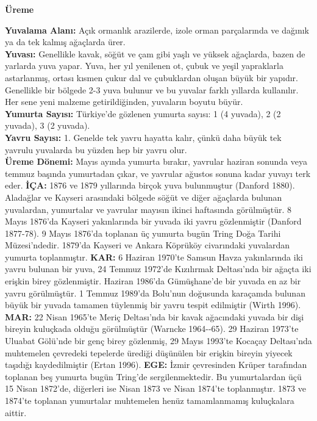 \documentclass[
  letterpaper,
  DIV=11,
  numbers=noendperiod]{scrreprt}
\begin{document}
\textbf{Üreme}

\textbf{Yuvalama Alanı:} Açık ormanlık arazilerde, izole orman
parçalarında ve dağınık ya da tek kalmış ağaçlarda ürer.\\
\textbf{Yuvası:} Genellikle kavak, söğüt ve çam gibi yaşlı ve yüksek
ağaçlarda, bazen de yarlarda yuva yapar. Yuva, her yıl yenilenen ot,
çubuk ve yeşil yapraklarla astarlanmış, ortası kısmen çukur dal ve
çubuklardan oluşan büyük bir yapıdır. Genellikle bir bölgede 2-3 yuva
bulunur ve bu yuvalar farklı yıllarda kullanılır. Her sene yeni malzeme
getirildiğinden, yuvaların boyutu büyür.\\
\textbf{Yumurta Sayısı:} Türkiye'de gözlenen yumurta sayısı: 1 (4
yuvada), 2 (2 yuvada), 3 (2 yuvada).\\
\textbf{Yavru Sayısı:} 1. Genelde tek yavru hayatta kalır, çünkü daha
büyük tek yavrulu yuvalarda bu yüzden hep bir yavru olur.\\
\textbf{Üreme Dönemi:} Mayıs ayında yumurta bırakır, yavrular haziran
sonunda veya temmuz başında yumurtadan çıkar, ve yavrular ağustos sonuna
kadar yuvayı terk eder. \textbf{İÇA:} 1876 ve 1879 yıllarında birçok
yuva bulunmuştur (Danford 1880). Aladağlar ve Kayseri arasındaki bölgede
söğüt ve diğer ağaçlarda bulunan yuvalardan, yumurtalar ve yavrular
mayısın ikinci haftasında görülmüştür. 8 Mayıs 1876'da Kayseri
yakınlarında bir yuvada iki yavru gözlenmiştir (Danford 1877-78). 9
Mayıs 1876'da toplanan üç yumurta bugün Tring Doğa Tarihi Müzesi'ndedir.
1879'da Kayseri ve Ankara Köprüköy civarındaki yuvalardan yumurta
toplanmıştır. \textbf{KAR:} 6 Haziran 1970'te Samsun Havza yakınlarında
iki yavru bulunan bir yuva, 24 Temmuz 1972'de Kızılırmak Deltası'nda bir
ağaçta iki erişkin birey gözlenmiştir. Haziran 1986'da Gümüşhane'de bir
yuvada en az bir yavru görülmüştür. 1 Temmuz 1989'da Bolu'nun doğusunda
karaçamda bulunan büyük bir yuvada tamamen tüylenmiş bir yavru tespit
edilmiştir (Wirth 1996). \textbf{MAR:} 22 Nisan 1965'te Meriç
Deltası'nda bir kavak ağacındaki yuvada bir dişi bireyin kuluçkada
olduğu görülmüştür (Warncke 1964-\/-65). 29 Haziran 1973'te Uluabat
Gölü'nde bir genç birey gözlenmiş, 29 Mayıs 1993'te Kocaçay Deltası'nda
muhtemelen çevredeki tepelerde ürediği düşünülen bir erişkin bireyin
yiyecek taşıdığı kaydedilmiştir (Ertan 1996). \textbf{EGE:} İzmir
çevresinden Krüper tarafından toplanan beş yumurta bugün Tring'de
sergilenmektedir. Bu yumurtalardan üçü 15 Nisan 1872'de, diğerleri ise
Nisan 1873 ve Nisan 1874'te toplanmıştır. 1873 ve 1874'te toplanan
yumurtalar muhtemelen henüz tamamlanmamış kuluçkalara aittir.
\end{document}
